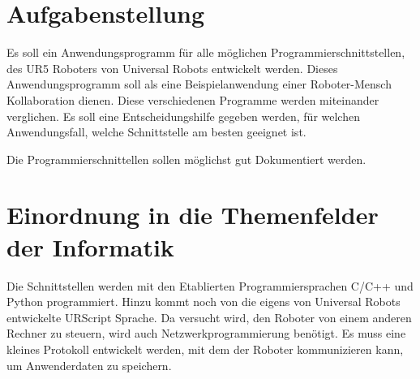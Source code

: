 \section{Aufgabenstellung}
\label{aufgabenstellung}

Es soll ein Anwendungsprogramm für alle möglichen Programmierschnittstellen, des UR5 Roboters von Universal Robots entwickelt werden.
Dieses Anwendungsprogramm soll als eine Beispielanwendung einer Roboter-Mensch Kollaboration dienen.
Diese verschiedenen Programme werden miteinander verglichen. Es soll eine Entscheidungshilfe gegeben werden, für welchen Anwendungsfall, welche Schnittstelle am besten geeignet ist.

Die Programmierschnittellen sollen möglichst gut Dokumentiert werden.  

\section{Einordnung in die Themenfelder der Informatik}
\label{sec:einordnung}

Die Schnittstellen werden mit den Etablierten Programmiersprachen C/C++ und Python programmiert. Hinzu kommt noch von die eigens von Universal Robots entwickelte URScript Sprache.
Da versucht wird, den Roboter von einem anderen Rechner zu steuern, wird auch Netzwerkprogrammierung benötigt. Es muss eine kleines Protokoll entwickelt werden, mit dem der Roboter kommunizieren kann, um Anwenderdaten zu speichern. 
